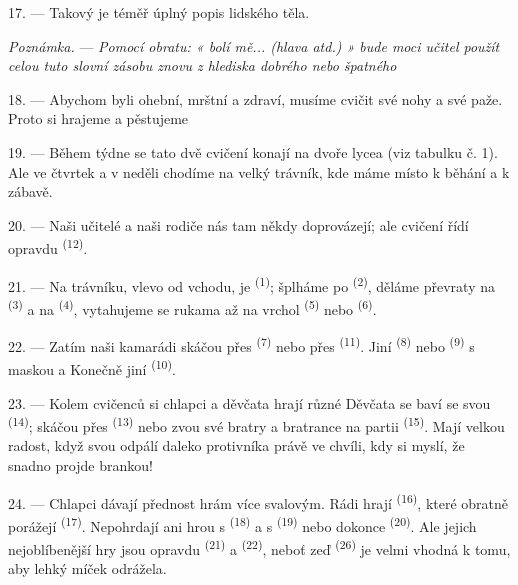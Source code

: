 17. --- Takový je téměř úplný popis lidského těla.

\textit{Poznámka.} --- \textit{Pomocí obratu: « bolí mě... (hlava atd.) » bude moci
učitel použít celou tuto slovní zásobu znovu z hlediska dobrého nebo špatného}

\VUsaut{5.0mm}
\VUsaut{2.4mm}
\VUsaut{3.0mm}

18. --- Abychom byli ohební, mrštní a zdraví, musíme cvičit své nohy a své paže. Proto
si hrajeme a pěstujeme 

19. --- Během týdne se tato dvě cvičení konají na dvoře lycea (viz tabulku č. 1). Ale
ve čtvrtek a v neděli chodíme na velký trávník, kde máme místo k běhání a k zábavě.

20. --- Naši učitelé a naši rodiče nás tam někdy doprovázejí; ale cvičení řídí
opravdu  \textsuperscript{(12)}.

21. --- Na trávníku, vlevo od vchodu, je 
\textsuperscript{(1)}; šplháme po  \textsuperscript{(2)}, děláme
převraty na  \textsuperscript{(3)} a na 
\textsuperscript{(4)}, vytahujeme se rukama až na vrchol 
\textsuperscript{(5)} nebo  \textsuperscript{(6)}.

22. --- Zatím naši kamarádi skáčou přes 
\textsuperscript{(7)} nebo přes  \textsuperscript{(11)}. Jiní
 \textsuperscript{(8)} nebo  \textsuperscript{(9)} s
maskou a  Konečně jiní 
\textsuperscript{(10)}.

\VUsaut{4.6mm}
\VUsaut{3.0mm}

23. --- Kolem cvičenců si chlapci a děvčata hrají různé  Děvčata se baví
se svou  \textsuperscript{(14)}; skáčou přes 
\textsuperscript{(13)} nebo zvou své bratry a bratrance na partii 
\textsuperscript{(15)}. Mají velkou radost, když svou 
odpálí daleko  protivníka právě ve chvíli, kdy si myslí, že snadno
projde brankou!

24. --- Chlapci dávají přednost hrám více svalovým. Rádi hrají 
\textsuperscript{(16)}, které obratně porážejí  \textsuperscript{(17)}.
Nepohrdají ani hrou s  \textsuperscript{(18)} a s  \textsuperscript{(19)} nebo dokonce 
\textsuperscript{(20)}. Ale jejich nejoblíbenější hry jsou opravdu 
\textsuperscript{(21)} a  \textsuperscript{(22)}, neboť zeď
 \textsuperscript{(26)} je velmi vhodná k tomu, aby lehký míček
odrážela.

